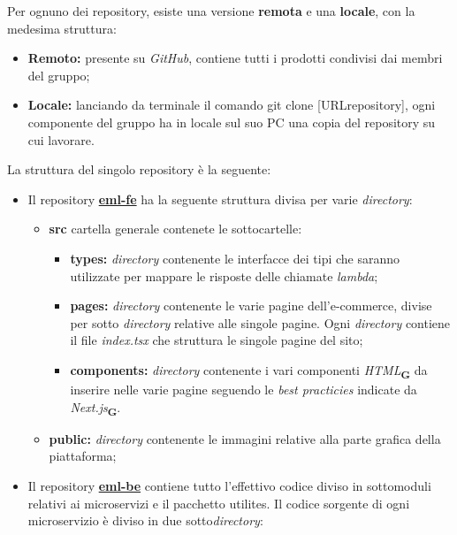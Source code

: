 Per ognuno dei repository, esiste una versione \textbf{remota} e una \textbf{locale}, con la medesima struttura:
\begin{itemize}
    \item \textbf{Remoto:} presente su \textit{GitHub}, contiene tutti i prodotti condivisi dai membri del gruppo;
    \item \textbf{Locale:} lanciando da terminale il comando {\selectfont git clone [URLrepository]}, ogni componente del gruppo ha in locale sul suo PC una copia del repository su cui lavorare.
\end{itemize}
La struttura del singolo repository è la seguente:
\begin{itemize}
    \item Il repository \textbf{\href{https://github.com/techsweave/eml-fe.git}{eml-fe}} ha la seguente struttura divisa per varie \textit{directory}:
          \begin{itemize}
              \item \textbf{src} cartella generale contenete le sottocartelle:
                    \begin{itemize}
                        \item \textbf{types:} \textit{directory} contenente le interfacce dei tipi che saranno utilizzate per mappare le risposte delle chiamate \textit{lambda};
                        \item \textbf{pages:} \textit{directory} contenente le varie pagine dell'e-commerce, divise per sotto \textit{directory} relative alle singole pagine. Ogni \textit{directory} contiene il file \textit{index.tsx} che struttura le singole pagine del sito;
                        \item \textbf{components:} \textit{directory} contenente i vari componenti \textit{HTML}\textsubscript{\textbf{G}} da inserire nelle varie pagine seguendo le \textit{best practicies} indicate da \textit{Next.js}\textsubscript{\textbf{G}}.
                    \end{itemize}
              \item \textbf{public:} \textit{directory} contenente le immagini relative alla parte grafica della piattaforma;
          \end{itemize}
    \item Il repository \textbf{\href{https://github.com/techsweave/eml-be.git}{eml-be}} contiene tutto l'effettivo codice diviso in sottomoduli relativi ai microservizi e il pacchetto utilites. Il codice sorgente  di ogni microservizio è diviso in due sotto\textit{directory}:

\end{itemize}
